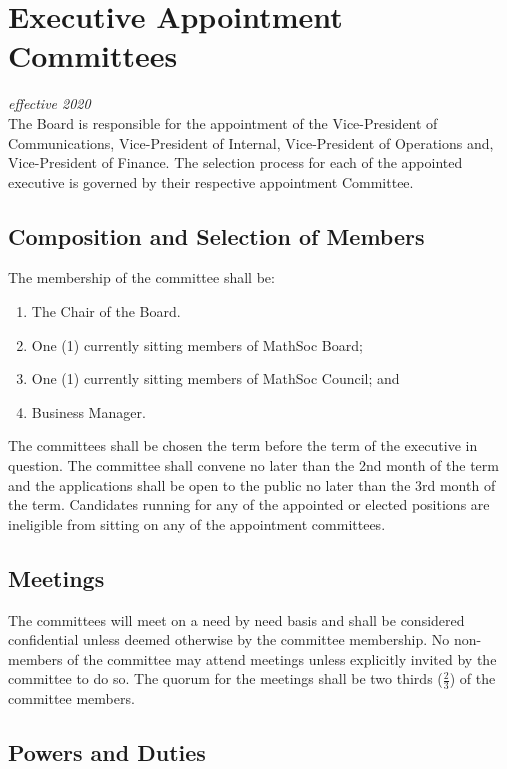 \section{Executive Appointment Committees}
\emph{effective 2020}\\

The Board is responsible for the appointment of the Vice-President of Communications, Vice-President of Internal, Vice-President of Operations and, Vice-President of Finance.  
The selection process for each of the appointed executive is governed by their respective appointment Committee. 

\subsection{Composition and Selection of Members}
The membership of the committee shall be:
\begin{enumerate}
    \item The Chair of the Board. 
    \item One (1) currently sitting members of MathSoc Board;
    \item One (1) currently sitting members of MathSoc Council; and
    \item Business Manager.
\end{enumerate}

The committees shall be chosen the term before the term of the executive in question. 
The committee shall convene no later than the 2nd month of the term and the applications shall be open to the public no later than the 3rd month of the term.
Candidates running for any of the appointed or elected positions are ineligible from sitting on any of the appointment committees. 

\subsection{Meetings}
The committees will meet on a need by need basis and shall be considered confidential unless deemed otherwise by the committee membership. 
No non-members of the committee may attend meetings unless explicitly invited by the committee to do so.
The quorum for the meetings shall be two thirds ($\frac{2}{3}$) of the committee members.

\subsection{Powers and Duties}

